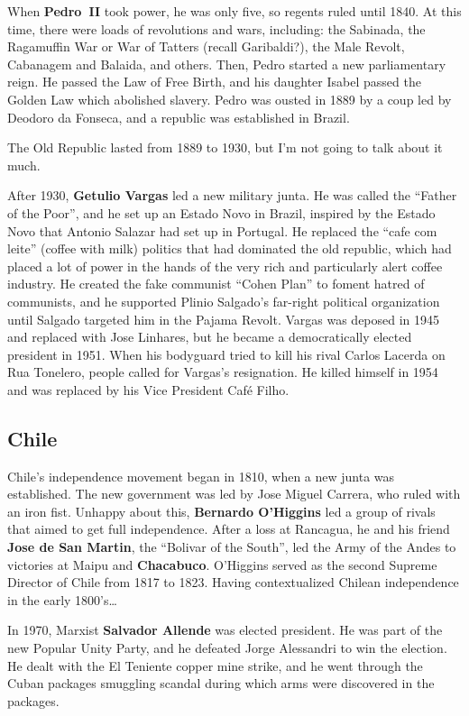 When \textbf{Pedro~II} took power, he was only five, so regents ruled until 1840.
At this time, there were loads of revolutions and wars, including:
the Sabinada,
the Ragamuffin War or War of Tatters (recall Garibaldi?),
the Male Revolt,
Cabanagem and Balaida,
and others.
Then, Pedro started a new parliamentary reign.
He passed the Law of Free Birth, and his daughter Isabel passed the Golden Law which abolished slavery.
Pedro was ousted in 1889 by a coup led by Deodoro da Fonseca, and a republic was established in Brazil.

The Old Republic lasted from 1889 to 1930, but I'm not going to talk about it much.

After 1930, \textbf{Getulio Vargas} led a new military junta.
He was called the ``Father of the Poor'', and he set up an Estado Novo in Brazil,
inspired by the Estado Novo that Antonio Salazar had set up in Portugal.
He replaced the ``cafe com leite'' (coffee with milk) politics that had dominated the old republic,
which had placed a lot of power in the hands of the very rich and particularly alert coffee industry.
He created the fake communist ``Cohen Plan'' to foment hatred of communists,
and he supported Plinio Salgado's far-right political organization until Salgado targeted him in the Pajama Revolt.
Vargas was deposed in 1945 and replaced with Jose Linhares,
but he became a democratically elected president in 1951.
When his bodyguard tried to kill his rival Carlos Lacerda on Rua Tonelero, people called for Vargas's resignation.
He killed himself in 1954 and was replaced by his Vice President Caf\'e Filho.

\subsection*{Chile}

Chile's independence movement began in 1810, when a new junta was established.
The new government was led by Jose Miguel Carrera, who ruled with an iron fist.
Unhappy about this, \textbf{Bernardo O'Higgins} led a group of rivals that aimed to get full independence.
After a loss at Rancagua, he and his friend \textbf{Jose de San Martin}, the ``Bolivar of the South'',
led the Army of the Andes to victories at Maipu and \textbf{Chacabuco}.
O'Higgins served as the second Supreme Director of Chile from 1817 to 1823.
Having contextualized Chilean independence in the early 1800's\ldots{}

In 1970, Marxist \textbf{Salvador Allende} was elected president.
He was part of the new Popular Unity Party, and he defeated Jorge Alessandri to win the election.
He dealt with the El Teniente copper mine strike,
and he went through the Cuban packages smuggling scandal during which arms were discovered in the packages.

